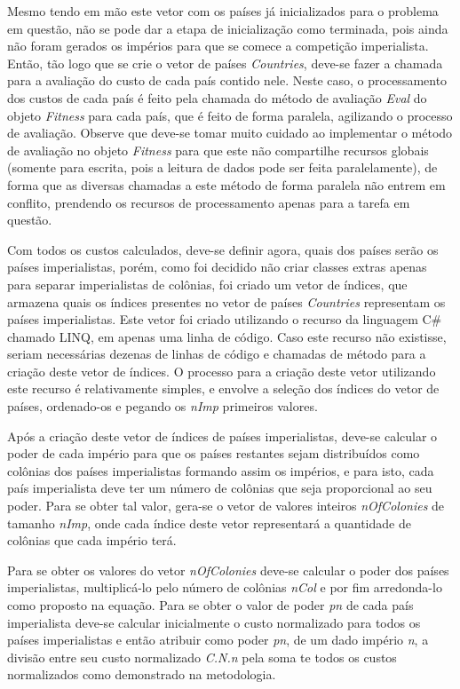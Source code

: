 Mesmo tendo em mão este vetor com os países já inicializados para o problema em questão, não se pode dar a etapa de inicialização como terminada, pois ainda não foram gerados os impérios para que se comece a competição imperialista. Então, tão logo que se crie o vetor de países \emph{Countries}, deve-se fazer a chamada para a avaliação do custo de cada país contido nele. Neste caso, o processamento dos custos de cada país é feito pela chamada do método de avaliação \emph{Eval} do objeto \emph{Fitness} para cada país, que é feito de forma paralela, agilizando o processo de avaliação. Observe que deve-se tomar muito cuidado ao implementar o método de avaliação no objeto \emph{Fitness} para que este não compartilhe recursos globais (somente para escrita, pois a leitura de dados pode ser feita paralelamente), de forma que as diversas chamadas a este método de forma paralela não entrem em conflito, prendendo os recursos de processamento apenas para a tarefa em questão.

Com todos os custos calculados, deve-se definir agora, quais dos países serão os países imperialistas, porém, como foi decidido não criar classes extras apenas para separar imperialistas de colônias, foi criado um vetor de índices, que armazena quais os índices presentes no vetor de países \emph{Countries} representam os países imperialistas. Este vetor foi criado utilizando o recurso da linguagem C\# chamado LINQ, em apenas uma linha de código. Caso este recurso não existisse, seriam necessárias dezenas de linhas de código e chamadas de método para a criação deste vetor de índices. O processo para a criação deste vetor utilizando este recurso é relativamente simples, e envolve a seleção dos índices do vetor de países, ordenado-os e pegando os \emph{nImp} primeiros valores.

Após a criação deste vetor de índices de países imperialistas, deve-se calcular o poder de cada império para que os países restantes sejam distribuídos como colônias dos países imperialistas formando assim os impérios, e para isto, cada país imperialista deve ter um número de colônias que seja proporcional ao seu poder. Para se obter tal valor, gera-se o vetor de valores inteiros \emph{nOfColonies} de tamanho \emph{nImp}, onde cada índice deste vetor representará a quantidade de colônias que cada império terá. 

Para se obter os valores do vetor \emph{nOfColonies} deve-se calcular o poder dos países imperialistas, multiplicá-lo pelo número de colônias \emph{nCol} e por fim arredonda-lo como proposto na equação. Para se obter o valor de poder \emph{pn} de cada país imperialista deve-se calcular inicialmente o custo normalizado para todos os países imperialistas e então atribuir como poder \emph{pn}, de um dado império \emph{n}, a divisão entre seu custo normalizado \emph{C.N.n} pela soma te todos os custos normalizados como demonstrado na metodologia. 

